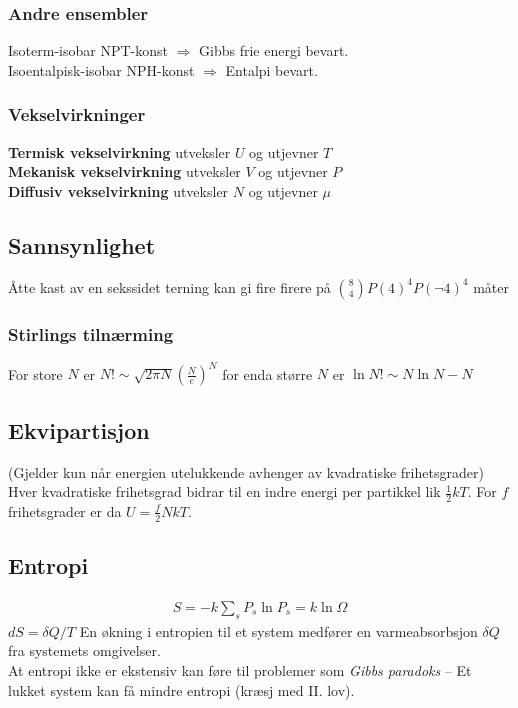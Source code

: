 \documentclass[a4paper, norsk, 10pt]{article}
\newcommand{\EQU}[1] { \begin{equation*} \begin{split}
#1  
\end{split} \end{equation*} }
\begin{document}
\begin{multicols*}{2}
\subsubsection*{Andre ensembler}
Isoterm-isobar NPT-konst $\Rightarrow $ Gibbs frie energi bevart. \\
Isoentalpisk-isobar NPH-konst $\Rightarrow $ Entalpi bevart. \\

\subsubsection*{Vekselvirkninger}
\textbf{Termisk vekselvirkning} utveksler $U$ og utjevner $T$\\
\textbf{Mekanisk vekselvirkning} utveksler $V$ og utjevner $P$\\
\textbf{Diffusiv vekselvirkning} utveksler $N$ og utjevner $\mu$\\

\subsection*{Sannsynlighet}
Åtte kast av en sekssidet terning kan gi fire firere på $\binom{8}{4}P(4)^4P(\neg 4)^{4}$ måter

\subsubsection*{Stirlings tilnærming}
For store $N$ er $N! \sim \sqrt{2\pi N}\left(\frac{N}{e}\right)^N$
for enda større $N$ er $\ln N! \sim N\ln N-N$


\subsection*{Ekvipartisjon}
(Gjelder kun når energien utelukkende avhenger av kvadratiske frihetsgrader) \\
Hver kvadratiske frihetsgrad bidrar til en indre energi per partikkel lik $\frac{1}{2}kT$. For $f$ frihetsgrader er da $U=\frac{f}{2}NkT$.

\subsection*{Entropi}
\EQU{
S = -k \sum_s P_s \ln P_s = k\ln \Omega
}
$dS=\delta Q/T$ En økning i entropien til et system medfører en varmeabsorbsjon $\delta Q$ fra systemets omgivelser. \\
At entropi ikke er ekstensiv kan føre til problemer som \textit{Gibbs paradoks} -- Et lukket system kan få mindre entropi (kræsj med II. lov).


\end{multicols*}
\end{document}
